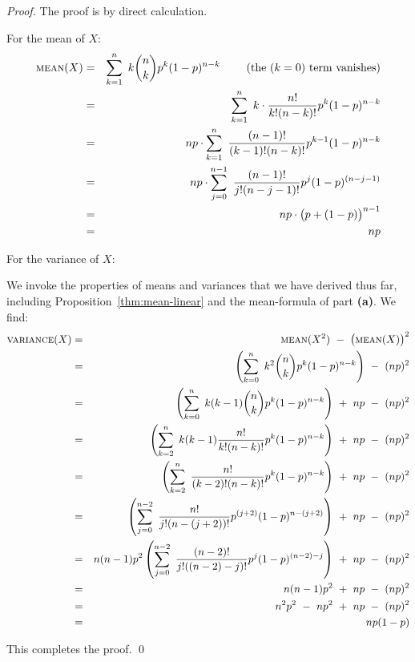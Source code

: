 \begin{proof}
The proof is by direct calculation.

\smallskip

 For the mean of $X$:
\begin{eqnarray*} 
\mbox{\sc mean}(X) & = &
\sum_{k=1}^n \ k {n \choose k} p^k (1-p)^{n-k} \ \ \ \ \ \ \ \mbox{(the $(k=0)$ term vanishes)} \\
  & = &
\sum_{k=1}^n \ k \cdot \frac{n!}{k! (n-k)!} p^k (1-p)^{n-k} \\
  & = &
np \cdot \sum_{k=1}^n \ \frac{(n-1)!}{(k-1)! (n-k)!} p^{k-1} (1-p)^{n-k} \\
  & = &
np \cdot \sum_{j=0}^{n-1} \ \frac{(n-1)!}{j! (n-j-1)!} p^{j} (1-p)^{(n-j-1)} \\
  & = &
np \cdot \big(p + (1-p) \big)^{n-1} \\
  & = &
np
\end{eqnarray*}

\medskip

 For the variance of $X$:

\smallskip

We invoke the properties of means and variances that we have derived thus far, including Proposition~\ref{thm:mean-linear} and the mean-formula of part {\bf (a)}.  We find:
\begin{eqnarray*} 
\mbox{\sc variance}(X) & = & 
\mbox{\sc mean}(X^2) \ - \  \big(\mbox{\sc mean}(X) \big)^2 \\
  & = &
\left( \sum_{k=0}^n \ k^2 {n \choose k} p^k (1-p)^{n-k} \right)
 \ - \ (np)^2  \\
  & = &
\left( \sum_{k=0}^n \ k(k-1) {n \choose k} p^k (1-p)^{n-k} \right)
 \ + \ np
 \ - \ (np)^2  \\
  & = &
\left( \sum_{k=2}^n \ k(k-1) \frac{n!}{k! (n-k)!} p^k (1-p)^{n-k} \right)
 \ + \ np
 \ - \ (np)^2  \\
  & = &
\left( \sum_{k=2}^n \ \frac{n!}{(k-2)! (n-k)!} p^k (1-p)^{n-k} \right)
 \ + \ np
 \ - \ (np)^2 \\
  & = &
\left( \sum_{j=0}^{n-2} \ \frac{n!}{j! (n-(j+2))!} p^{(j+2)} (1-p)^{n-(j+2)} \right)
 \ + \ np
 \ - \ (np)^2 \\
   & = &
n(n-1)p^2 \left( \sum_{j=0}^{n-2} \ \frac{(n-2)!}{j! ((n-2)-j)!} p^j (1-p)^{(n-2)-j} \right)
 \ + \ np
 \ - \ (np)^2 \\
     & = &
n(n-1)p^2  \ + \ np \ - \ (np)^2 \\
     & = &
n^2 p^2 \ - \ n p^2  \ + \ np \ - \ (np)^2 \\
     & = &
n p (1-p)
\end{eqnarray*}

\smallskip

\noindent
This completes the proof.  \qed
\end{proof}

